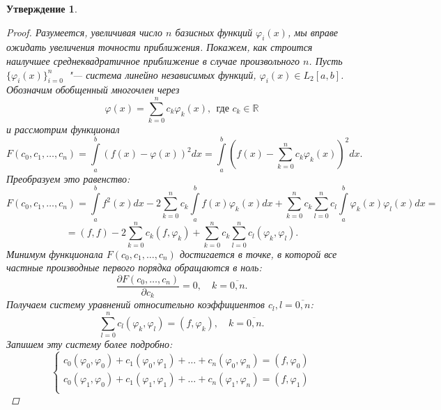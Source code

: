 \documentclass[11pt,a4paper,twoside,listtotoc,bibtotoc]{report}
\numberwithin{equation}{section}
\newtheorem*{statement}{Утверждение}
\theoremstyle{definition}
\theoremstyle{plain}
\begin{document}
\begin{statement}
\begin{proof}
        Разумеется, увеличивая число $n$ базисных функций $\varphi_i(x)$, мы
        вправе ожидать увеличения точности приближения. Покажем, как строится
        наилучшее среднеквадратичное приближение в случае произвольного $n$.
        Пусть $\{\varphi_i(x)\}_{i=0}^n$~"--- система
        линейно независимых функций, $\varphi_i(x) \in L_2[a,b]$. Обозначим
        обобщенный многочлен через
        $$
        \varphi(x) = \sum\limits_{k=0}^n c_k\varphi_k(x), ~~\mbox{где } c_k\in\mathbb{R}
        $$
        и рассмотрим функционал
        $$
            F(c_0, c_1, \dots, c_n) = \int\limits_a^b (f(x) - \varphi(x))^2dx =
            \int\limits_a^b (f(x) - \sum_{k=0}^n c_k \varphi_k(x))^2dx.
        $$
        Преобразуем это равенство:
        \begin{equation*}
            F(c_0, c_1, \dots, c_n) = \int\limits_a^b f^2(x)dx - 2\sum_{k=0}^nc_k
            \int\limits_a^b f(x) \varphi_k(x)dx + \sum_{k=0}^n c_k \sum_{l=0}^n
            c_l \int\limits_a^b \varphi_k(x) \varphi_l(x) dx =
        \end{equation*}
        \begin{equation*}
            = (f,f) - 2 \sum_{k=0}^n c_k (f, \varphi_k) + \sum_{k=0}^n c_k
            \sum_{l=0}^n c_l(\varphi_k, \varphi_l).
        \end{equation*}
        Минимум функционала $F(c_0, c_1, \dots, c_n)$ достигается в точке,
        в которой все частные производные первого порядка обращаются в ноль:
        $$
            \frac{\partial F(c_0, \dots, c_n)}{\partial c_k} = 0,
            \quad k = \overline{0,n}.
        $$
        Получаем систему уравнений относительно коэффициентов $c_l, l = \overline{0,n}$:
        $$
            \sum_{l=0}^n c_l(\varphi_k, \varphi_l) = (f, \varphi_k),
            \quad k = \overline{0,n}.
        $$
        Запишем эту систему более подробно:
        \begin{equation}
            \begin{cases}
                \label{eq:F_ci_system2}
                c_0(\varphi_0, \varphi_0) + c_1 (\varphi_0, \varphi_1) +
                \ldots + c_n (\varphi_0, \varphi_n) = (f, \varphi_0) \\
                c_0(\varphi_1, \varphi_0) + c_1 (\varphi_1, \varphi_1) +
                \ldots + c_n (\varphi_1, \varphi_n) = (f, \varphi_1) \\

\end{cases}
\end{equation}
\end{proof}
\end{statement}
\end{document}
